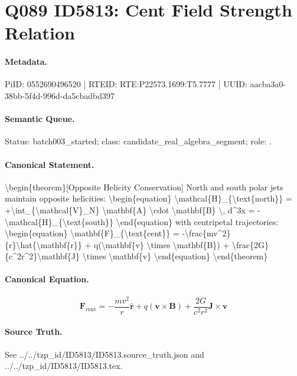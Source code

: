 \section*{Q089 ID5813: Cent Field Strength Relation}
\paragraph{Metadata.}
PiID: 0552690496520 | RTEID: RTE:P22573.1699:T5.7777 | UUID: aacba3a0-38bb-5f4d-996d-da5cbadbd397

\paragraph{Semantic Queue.}
Status: batch003\_started; class: candidate\_real\_algebra\_segment; role: .

\paragraph{Canonical Statement.}
\textbackslash{}begin\{theorem\}[Opposite Helicity Conservation] North and south polar jets maintain opposite helicities: \textbackslash{}begin\{equation\} \textbackslash{}mathcal\{H\}\_\{\textbackslash{}text\{north\}\} = +\textbackslash{}int\_\{\textbackslash{}mathcal\{V\}\_N\} \textbackslash{}mathbf\{A\} \textbackslash{}cdot \textbackslash{}mathbf\{B\} \textbackslash{}, d\textasciicircum{}3x = -\textbackslash{}mathcal\{H\}\_\{\textbackslash{}text\{south\}\} \textbackslash{}end\{equation\} with centripetal trajectories: \textbackslash{}begin\{equation\} \textbackslash{}mathbf\{F\}\_\{\textbackslash{}text\{cent\}\} = -\textbackslash{}frac\{mv\textasciicircum{}2\}\{r\}\textbackslash{}hat\{\textbackslash{}mathbf\{r\}\} + q(\textbackslash{}mathbf\{v\} \textbackslash{}times \textbackslash{}mathbf\{B\}) + \textbackslash{}frac\{2G\}\{c\textasciicircum{}2r\textasciicircum{}2\}\textbackslash{}mathbf\{J\} \textbackslash{}times \textbackslash{}mathbf\{v\} \textbackslash{}end\{equation\} \textbackslash{}end\{theorem\}

\paragraph{Canonical Equation.}
\[
\begin{equation} \mathbf{F}_{\text{cent}} = -\frac{mv^2}{r}\hat{\mathbf{r}} + q(\mathbf{v} \times \mathbf{B}) + \frac{2G}{c^2r^2}\mathbf{J} \times \mathbf{v} \end{equation}
\]

\paragraph{Source Truth.}
See ../../tzp\_id/ID5813/ID5813.source\_truth.json and ../../tzp\_id/ID5813/ID5813.tex.
